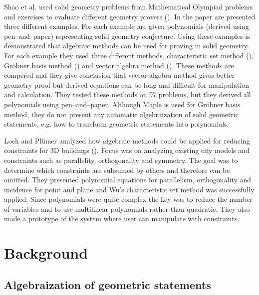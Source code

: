 \documentclass[final,1p,times,authoryear]{elsarticle}
\begin{document}
Shao et al. used solid geometry problems from Mathematical Olympiad
problems and exercises to evaluate different geometry provers
(\cite{shao2016challenging}). In the paper are presented three
different examples. For each example are given polynomials (derived
using pen--and--paper) representing solid geometry conjecture. Using
these examples is demonstrated that algebraic methods can be used for
proving in solid geometry. For each example they used three different
methods, characteristic set method (\cite{wu}), Gr\"obner basis method
(\cite{buchberger}) and vector algebra method (\cite{lord1985method}).
These methods are compered and they give conclusion that vector
algebra method gives better geometry proof but derived equations can
be long and difficult for manipulation and calculation. They tested
these methods on 97 problems, but they derived all polynomials using
pen--and--paper. Although Maple is used for Gr\"obner basis method,
they do not present any automatic algebraization of solid geometric
statements, e.g. how to transform geometric statements into
polynomials.

Loch and Pl{\"u}mer analyzed how algebraic methods could be applied
for reducing constraints for 3D buildings
(\cite{loch2009geometric}). Focus was on analyzing existing city
models and constraints such as parallelity, orthogonality and
symmetry. The goal was to determine which constraints are subsumed by
others and therefore can be omitted.  They presented polynomial
equations for parallelism, orthogonality and incidence for point and
plane and Wu's characteristic set method was successfully
applied. Since polynomials were quite complex the key was to reduce
the number of variables and to use multilinear polynomials rather than
quadratic. They also made a prototype of the system where user can
manipulate with constraints.

\section{Background}
\subsection{Algebraization of geometric statements}
\end{document}
